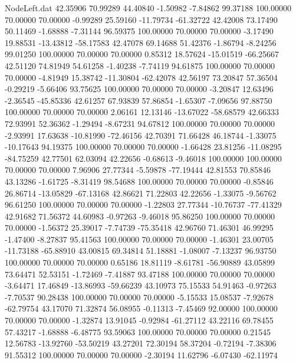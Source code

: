 \begin{filecontents}{NodeLeft.dat}
  42.35906   70.99289   44.40840    -1.50982   -7.84862   99.37188  100.00000   70.00000   70.00000   -0.99289   25.59160  -11.79734  -61.32722
  42.42008   73.17490   50.11469    -1.68888   -7.31144   96.59375  100.00000   70.00000   70.00000   -3.17490   19.88531  -13.43812  -58.17583
  42.47078   69.14688   51.42376    -1.86794   -8.24256   99.01250  100.00000   70.00000   70.00000    0.85312   18.57624  -15.01519  -66.25667
  42.51120   74.81949   54.61258    -1.40238   -7.74119   94.61875  100.00000   70.00000   70.00000   -4.81949   15.38742  -11.30804  -62.42078
  42.56197   73.20847   57.36504    -0.29219   -5.66406   93.75625  100.00000   70.00000   70.00000   -3.20847   12.63496   -2.36545  -45.85336
  42.61257   67.93839   57.86854    -1.65307   -7.09656   97.88750  100.00000   70.00000   70.00000    2.06161   12.13146  -13.67022  -58.68579
  42.66333   72.93991   52.36362    -1.29494   -8.67231   94.67812  100.00000   70.00000   70.00000   -2.93991   17.63638  -10.81990  -72.46156
  42.70391   71.66428   46.18744    -1.33075  -10.17643   94.19375  100.00000   70.00000   70.00000   -1.66428   23.81256  -11.08295  -84.75259
  42.77501   62.03094   42.22656    -0.68613   -9.46018  100.00000  100.00000   70.00000   70.00000    7.96906   27.77344   -5.59878  -77.19444
  42.81553   70.85846   43.13286    -1.61725   -8.31419   98.54688  100.00000   70.00000   70.00000   -0.85846   26.86714  -13.05829  -67.13168
  42.86621   71.22803   42.22656    -1.33075   -9.56762   96.61250  100.00000   70.00000   70.00000   -1.22803   27.77344  -10.76737  -77.41329
  42.91682   71.56372   44.60983    -0.97263   -9.46018   95.86250  100.00000   70.00000   70.00000   -1.56372   25.39017   -7.74739  -75.35418
  42.96760   71.46301   46.99295    -1.47400   -8.27837   95.41563  100.00000   70.00000   70.00000   -1.46301   23.00705  -11.73188  -65.88910
  43.00815   69.34814   51.18881    -1.08007   -7.13237   96.93750  100.00000   70.00000   70.00000    0.65186   18.81119   -8.61781  -56.90889
  43.05899   73.64471   52.53151    -1.72469   -7.41887   93.47188  100.00000   70.00000   70.00000   -3.64471   17.46849  -13.86993  -59.66239
  43.10973   75.15533   54.91463    -0.97263   -7.70537   90.28438  100.00000   70.00000   70.00000   -5.15533   15.08537   -7.92678  -62.79754
  43.17070   71.32874   56.08955    -0.11313   -7.45469   92.00000  100.00000   70.00000   70.00000   -1.32874   13.91045   -0.92984  -61.27112
  43.22116   69.78455   57.43217    -1.68888   -6.48775   93.59063  100.00000   70.00000   70.00000    0.21545   12.56783  -13.92760  -53.50219
  43.27201   72.30194   58.37204    -0.72194   -7.38306   91.55312  100.00000   70.00000   70.00000   -2.30194   11.62796   -6.07430  -62.11974

\end{filecontents}

